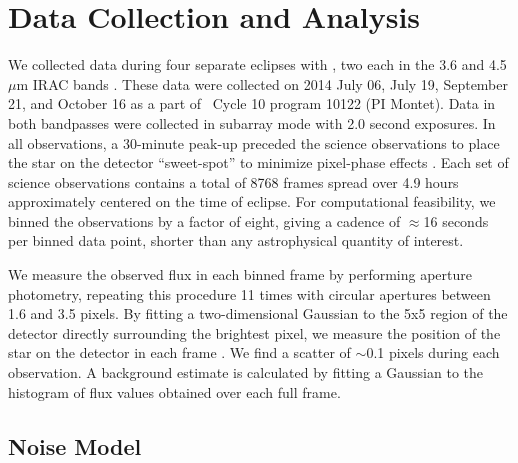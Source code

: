 \section{Data Collection and Analysis}


We collected data during four separate eclipses with \spitz, two 
each in the 3.6 and 4.5 $\mu$m IRAC bands \citep{Fazio04}. 
These data were collected on 2014 July 06, July 19, September 21, and October 16
as a part of \spitz\ Cycle 10 program 10122 (PI Montet).
Data in both bandpasses were collected in subarray mode with 2.0 second exposures.
In all observations, a 30-minute peak-up preceded the science observations
to place the star on the detector ``sweet-spot'' to minimize pixel-phase effects
\citep[e.g.][]{Ballard10}.
Each set of science observations contains a total of 8768 frames spread over
4.9 hours approximately centered on the time of eclipse.
For computational feasibility, we binned the observations by a factor of
eight, giving a cadence of $\approx$16 seconds per binned data point,
shorter than any astrophysical quantity of interest.

We measure the observed flux in each binned frame by performing aperture photometry,
repeating this procedure 11 times with circular apertures between 1.6 and 3.5 pixels.
By fitting a two-dimensional
Gaussian to the 5x5 region of the detector directly surrounding the brightest pixel,
we measure the position of the star on the detector in each frame \citep{Agol10}.
We find a scatter of $\sim$0.1 pixels during each observation.
A background estimate is calculated by fitting a Gaussian
to the histogram of flux values obtained over each full frame.

\subsection{Noise Model}

